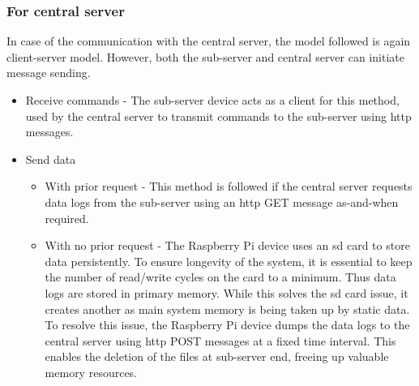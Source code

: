 \documentclass[letterpaper,11pt]{report}
\begin{document}
\subsubsection{For central server}
In case of the communication with the central server, the model followed is again client-server model. However, both the sub-server and central server can initiate message sending.
\begin{itemize}
    \item Receive commands - The sub-server device acts as a client for this method, used by the central server to transmit commands to the sub-server using \ac{http} messages.
    \item Send data
    \begin{itemize}
        \item With prior request - This method is followed if the central server requests data logs from the sub-server using an \ac{http} GET message as-and-when required.
        \item With no prior request - The Raspberry Pi device uses an \ac{sd} card to store data persistently. To ensure longevity of the system, it is essential to keep the number of read/write cycles on the card to a minimum. Thus data logs are stored in primary memory. While this solves the \ac{sd} card issue, it creates another as main system memory is being taken up by static data. To resolve this issue, the Raspberry Pi device dumps the data logs to the central server using \ac{http} POST messages at a fixed time interval. This enables the deletion of the files at sub-server end, freeing up valuable memory resources.
    \end{itemize}
\end{itemize}

\newpage
\end{document}
